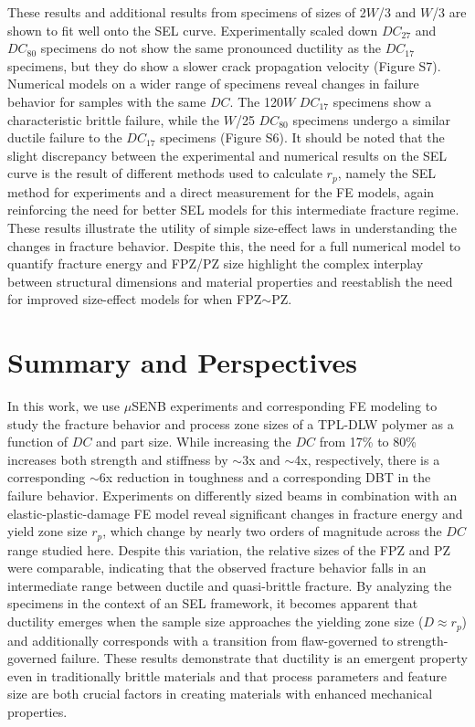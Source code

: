 \documentclass[11pt]{article}
\providecommand{\uSENB}[0]{$\mu$SENB}
\providecommand{\rp}[0]{$r_p$}
\providecommand{\DC}[0]{$DC$}
\providecommand{\DCi}[0]{$DC_{17}$}
\providecommand{\DCj}[0]{$DC_{27}$}
\providecommand{\DCk}[0]{$DC_{80}$}
\begin{document}
        These results and additional results from specimens of sizes of 2$W$/3 and $W$/3 are shown to fit well onto the SEL curve.
        Experimentally scaled down \DCj{} and \DCk{} specimens do not show the same pronounced ductility as the \DCi{} specimens, but they do show a slower crack propagation velocity (Figure S7).
        Numerical models on a wider range of specimens reveal changes in failure behavior for samples with the same \DC{}.
        The 120$W$ \DCi{} specimens show a characteristic brittle failure, while the $W$/25 \DCk{} specimens undergo a similar ductile failure to the \DCi{} specimens (Figure S6).
        It should be noted that the slight discrepancy between the experimental and numerical results on the SEL curve is the result of different methods used to calculate \rp{}, namely the SEL method for experiments and a direct measurement for the FE models, again reinforcing the need for better SEL models for this intermediate fracture regime.
        These results illustrate the utility of simple size-effect laws in understanding the changes in fracture behavior.
        Despite this, the need for a full numerical model to quantify fracture energy and FPZ/PZ size highlight the complex interplay between structural dimensions and material properties and reestablish the need for improved size-effect models for when FPZ$\sim$PZ.

    \section{Summary and Perspectives}
        In this work, we use \uSENB{} experiments and corresponding FE modeling to study the fracture behavior and process zone sizes of a TPL-DLW polymer as a function of \DC{} and part size. 
        While increasing the \DC{} from 17\% to 80\% increases both strength and stiffness by $\sim$3x and $\sim$4x, respectively, there is a corresponding $\sim$6x reduction in toughness and a corresponding DBT in the failure behavior.
        Experiments on differently sized beams in combination with an elastic-plastic-damage FE model reveal significant changes in fracture energy and yield zone size \rp{}, which change by nearly two orders of magnitude across the \DC{} range studied here.
        Despite this variation, the relative sizes of the FPZ and PZ were comparable, indicating that the observed fracture behavior falls in an intermediate range between ductile and quasi-brittle fracture.
        By analyzing the specimens in the context of an SEL framework, it becomes apparent that ductility emerges when the sample size approaches the yielding zone size ($D\approx$\rp{}) and additionally corresponds with a transition from flaw-governed to strength-governed failure.
        These results demonstrate that ductility is an emergent property even in traditionally brittle materials and that process parameters and feature size are both crucial factors in creating materials with enhanced mechanical properties.
\end{document}
